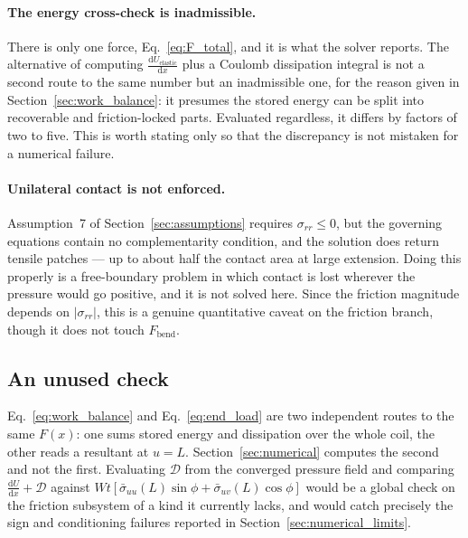 \documentclass[11pt]{article}
\begin{document}
\paragraph{The energy cross-check is inadmissible.} There is only one force,
Eq.~\eqref{eq:F_total}, and it is what the solver reports. The alternative of
computing $\frac{\mathrm d U_{\mathrm{elastic}}}{\mathrm d x}$ plus a Coulomb
dissipation integral is not a second route to the same number but an inadmissible
one, for the reason given in Section~\ref{sec:work_balance}: it presumes the
stored energy can be split into recoverable and friction-locked parts. Evaluated
regardless, it differs by factors of two to five. This is worth stating only so
that the discrepancy is not mistaken for a numerical failure.

\paragraph{Unilateral contact is not enforced.} Assumption~7 of
Section~\ref{sec:assumptions} requires $\sigma_{rr} \le 0$, but the governing
equations contain no complementarity condition, and the solution does return
tensile patches --- up to about half the contact area at large extension. Doing
this properly is a free-boundary problem in which contact is lost wherever the
pressure would go positive, and it is not solved here. Since the friction
magnitude depends on $\left|\sigma_{rr}\right|$, this is a genuine quantitative
caveat on the friction branch, though it does not touch $F_{\mathrm{bend}}$.

\subsection{An unused check}\label{sec:unused_check}
Eq.~\eqref{eq:work_balance} and
Eq.~\eqref{eq:end_load} are two independent routes to the same $F(x)$: one sums
stored energy and dissipation over the whole coil, the other reads a resultant at
$u = L$. Section~\ref{sec:numerical} computes the second and not the first.
Evaluating $\mathcal D$ from the converged pressure field and comparing
$\frac{\mathrm dU}{\mathrm dx} + \mathcal D$ against
$W t\left[\bar\sigma_{uu}(L)\sin\phi + \bar\sigma_{uv}(L)\cos\phi\right]$ would
be a global check on the friction subsystem of a kind it currently lacks, and
would catch precisely the sign and conditioning failures reported in
Section~\ref{sec:numerical_limits}.
\end{document}
